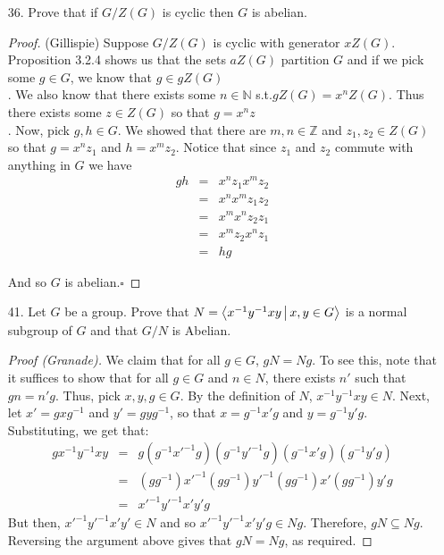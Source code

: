 \documentclass[10pt]{article}
\theoremstyle{plain}
\begin{document}
\begin{itemize}
\item[36.]  Prove that if $G/Z(G)$ is cyclic then $G$ is abelian.
\begin{proof}(Gillispie) 
Suppose $G/Z(G)$ is cyclic with generator $xZ(G)$.\\
Proposition 3.2.4 shows us that the sets $aZ(G)$ partition $G$ and if we pick some $g\in G$, we know that $g\in gZ(G)$\\.
We also know that there exists some $n\in\mathbb{N}$ s.t.$gZ(G)=x^{n}Z(G)$. Thus there exists some $z\in Z(G)$ so that $g=x^{n}z$\\.
Now, pick $g,h\in G$.
We showed that there are $m,n\in\mathbb{Z}$ and $z_{1},z_{2}\in Z(G)$ so that  $g=x^{n}z_{1}$ and  $h=x^{m}z_{2}$.
Notice that since $z_{1}$ and $z_{2}$ commute with anything in $G$ we have 
 \begin{eqnarray*}
gh & = & x^{n}z_{1}x^{m}z_{2}\\
 & = & x^{n}x^{m}z_{1}z_{2}\\
 & = & x^{m}x^{n}z_{2}z_{1}\\
 & = & x^{m}z_{2}x^{n}z_{1}\\
 & = & hg
 \end{eqnarray*}

And so  $G$ is abelian.$\square$

 


\end{proof}

\item [41.] Let $G$ be a group. Prove that
$N=\Braket{x^{-1}y^{-1}xy|x,y\in G}$
is a normal subgroup of $G$ and that $G/N$ is Abelian.

\begin{proof}[Proof (Granade)]
We claim that for all $g\in G$, $gN=Ng$. To see this, note that
it suffices to show that for all $g\in G$ and $n\in N$, there exists
$n'$ such that $gn=n'g$. Thus, pick $x,y,g\in G$. By the definition
of $N$, $x^{-1}y^{-1}xy\in N$. Next, let $x'=gxg^{-1}$ and $y'=gyg^{-1}$,
so that $x=g^{-1}x'g$ and $y=g^{-1}y'g$. Substituting, we get that:
\begin{eqnarray*}
gx^{-1}y^{-1}xy & = & g\left(g^{-1}x'^{-1}g\right)\left(g^{-1}y'^{-1}g\right)\left(g^{-1}x'g\right)\left(g^{-1}y'g\right)\\
 & = & \left(gg^{-1}\right)x'^{-1}\left(gg^{-1}\right)y'^{-1}\left(gg^{-1}\right)x'\left(gg^{-1}\right)y'g\\
 & = & x'^{-1}y'^{-1}x'y'g
\end{eqnarray*}
But then, $x'^{-1}y'^{-1}x'y'\in N$ and so $x'^{-1}y'^{-1}x'y'g\in Ng$.
Therefore, $gN\subseteq Ng$. Reversing the argument above gives that
$gN=Ng$, as required.
\end{proof}


\end{itemize}
\end{document}

